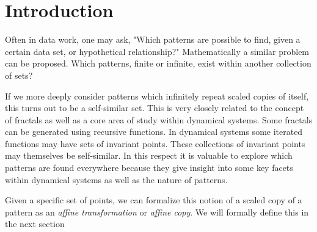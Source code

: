 \chapter{Introduction}


Often in data work, one may ask, "Which patterns are possible to find, given a certain data set, or hypothetical relationship?"  Mathematically a similar problem can be proposed.  Which patterns, finite or infinite, exist within another collection of sets?  

If we more deeply consider patterns which infinitely repeat scaled copies of itself, this turns out to be a self-similar set.  This is very closely related to the concept of fractals as well as a core area of study within dynamical systems.  Some fractals can be generated using recursive functions.  In dynamical systems some iterated functions may have sets of invariant points.  These collections of invariant points may themselves be self-similar.  In this respect it is valuable to explore which patterns are found everywhere because they give insight into some key facets within dynamical systems as well as the nature of patterns.  

Given a specific set of points, we can formalize this notion of a scaled copy of a pattern as an \textit{affine transformation} or \textit{affine copy}.  We will formally define this in the next section

